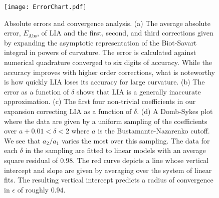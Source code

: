 \documentclass[aps,graphicx,reprint,onecolumn,12pt,tightenlines,longbibliography]{revtex4-1}
\newcommand{\sas}[2]{{#2}}
\begin{document}
%
\begin{figure}
\texttt{[image: ErrorChart.pdf]}
\caption{Absolute errors and convergence analysis. (a) The average absolute error, $E_{\mbox{Abs}}$, of LIA and the first, second, and third corrections given by expanding the asymptotic representation of the Biot-Savart integral in powers of curvature. The error is calculated against   numerical quadrature converged to six digits of accuracy. While the accuracy improves with higher order corrections, what is noteworthy is how quickly LIA loses  its accuracy for large curvature. (b) The error as a function of $\delta$ shows that LIA is a generally inaccurate approximation.  (c) \sas{Plots t}{T}he first four non-trivial coefficients in \sas{the}{our} expansion \sas{}{correcting LIA} as a function of $\delta$\sas{ which are positive and increasing}. (d)  A Domb-Sykes plot where the data are given by a uniform sampling of the coefficients over $a + 0.01< \delta < 2$\sas{.}{ where $a$ is the Bustamante-Nazarenko cutoff.}  We see that $a_{2}/a_{1}$ varies the most over this sampling. The data for each $\delta$ in the sampling are fitted to linear models with an average square residual of $0.98$. The red curve depicts a line whose vertical intercept and slope are given by averaging over the system of linear fits. The resulting vertical intercept predicts a radius of convergence in $\epsilon$ of roughly $0.94$.}
\label{fig:error}
\end{figure}
%
\end{document}
